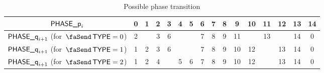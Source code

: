 \begin{table}[h]
    \centering
    \begin{tabular}{|c|c|c|c|c|c|c|c|c|c|c|c|c|c|c|c|} \hline
        $\textsf{PHASE\_p}_{i}$                         & 0 & 1 & 2 & 3 & 4 & 5 & 6 & 7 & 8 & 9  & 10 & 11 & 12 & 13 & 14 \\ \hline \hline
        $\textsf{PHASE\_q}_{i + 1}$ (for $\txType = 0$) & 2 &   & 3 & 6 &   &   & 7 & 8 & 9 & 11 &    & 13 &    & 14 & 0  \\ \hline
        $\textsf{PHASE\_q}_{i + 1}$ (for $\txType = 1$) & 1 & 2 & 3 & 6 &   &   & 7 & 8 & 9 & 10 & 12 &    & 13 & 14 & 0  \\ \hline
        $\textsf{PHASE\_q}_{i + 1}$ (for $\txType = 2$) & 1 & 2 & 4 &   & 5 & 6 & 7 & 8 & 9 & 10 & 12 &    & 13 & 14 & 0  \\ \hline
    \end{tabular}
    \caption{Possible phase transition}
    \label{tab:Possible phase transition}
\end{table}

